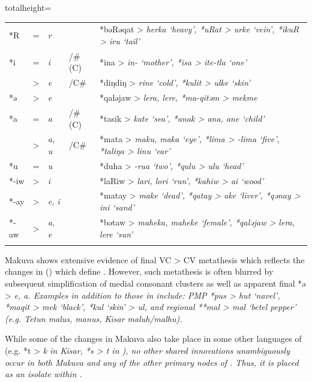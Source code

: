 \begin{table}[p]
\begin{adjustbox}{totalheight=\textheight}
\begin{tabularx}{\linewidth}{llllX}
*R	&	=	&	\it{r}		&		&	*bəRəqat > \it{herka} ‘heavy’, *uRat > \it{urke} ‘vein’, *ikuR > \it{iru} ‘tail’	\\	
*i	&	=	&	\it{i}		&	/{\#}(C){\gap}	&	*ina > \it{in-} ‘mother’, *isa > \it{ite-tla} ‘one’	\\	
		&	>	&	\it{e}		&	/{\gap}C{\#}		&	*diŋdiŋ > \it{rine} ‘cold’, *kulit > \it{ulke} ‘skin’	\\	
*ə	&	>	&	\it{e}		&									&	*qaləjaw > \it{lera, lere}, *ma-qitəm > \it{mekme}	\\	
*a	&	=	&	\it{a}		&	/{\#}(C){\gap}	&	*tasik > \it{kate} ‘sea’, *anak > \it{ana, ane} ‘child’	\\	
		&	>	&	\it{a, u}	&	/{\gap}C{\#}		&	*mata > \it{maku, maka} ‘eye’, *lima > \it{-lima} ‘five’, *taliŋa > \it{linu} ‘ear’	\\	
*u	&	=	&	\it{u}		&		&	*duha > \it{-rua} ‘two’, *qulu > \it{ulu} ‘head’	\\	
*-iw&	>	&	\it{i}		&		&	*laRiw > \it{lari, lori} ‘run’, *kahiw > \it{ai} ‘wood’	\\	
*-ay&	>	&	\it{e, i}	&		&	*matay > \it{make} ‘dead’, *qatay > \it{ake} ‘liver’, *qənay > \it{ini} ‘sand’	\\	
*-aw&	>	&	\it{a, e}	&		&	*bətaw > \it{maheka, maheke} ‘female’, *qaləjaw > \it{lera, lere} ‘sun’	\\	
		\lspbottomrule
	\end{tabularx}
\end{adjustbox}
\end{table}

Makuva shows extensive evidence of final VC > CV metathesis which
reflects the changes in  () which define .
However, such metathesis is often blurred by subsequent simplification
of medial consonant clusters as well as apparent final *ə > \it{e, a}.
Examples in addition to those in  include: PMP *pus
> \it{hut} ‘navel’, *maqit > \it{mek} ‘black’,
*kul ‘skin’ > \it{ul},
and regional **mal > \it{mal} ‘betel pepper’
(e.g. Tetun \it{malus},  \it{manus},
Kisar \it{maluh/malhu}).

While some of the changes in Makuva also take place in some other
languages of  (e.g.
*t > \it{k} in Kisar,
*s > \it{t} in ),
no other shared innovations unambiguously occur in both Makuva
and any of the other primary nodes of .
Thus, it is placed as an isolate within .

